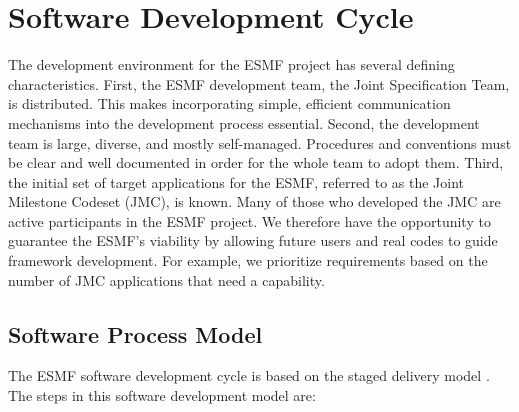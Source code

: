 
\section{Software Development Cycle}
\label{sec:life_cycle}

The development environment for the ESMF project has 
several defining characteristics.  First, the ESMF development team, the Joint
Specification Team, is distributed.  This makes incorporating simple, 
efficient communication mechanisms into the development process essential.  
Second, the development team is large, diverse, and mostly self-managed.  
Procedures and conventions must be clear and well documented in order for
the whole team to adopt them.  Third, the initial set of target 
applications for the ESMF, referred to as the Joint Milestone 
Codeset (JMC), is known.  Many of those who developed the JMC are 
active participants in the ESMF project.  We therefore have the 
opportunity to guarantee the ESMF's viability by allowing future users 
and real codes to guide framework development.  For example, we 
prioritize requirements based on the number of JMC applications 
that need a capability.  

\subsection{Software Process Model}

The ESMF software development cycle is based on the staged 
delivery model \cite{mcconnell96}.  The steps in this software development
model are:

